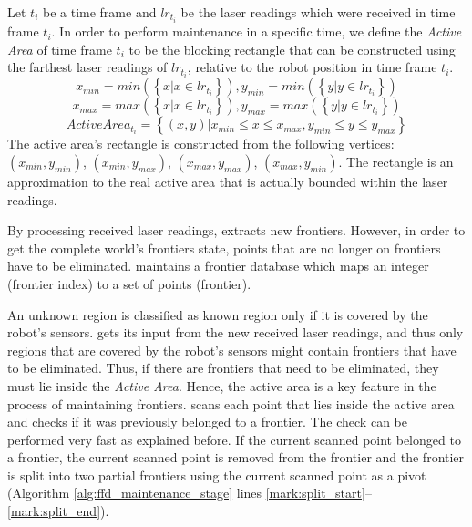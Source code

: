 	Let $t_i$ be a time frame and $lr_{t_i}$ be the laser readings which
	were received in time frame $t_i$. In order to perform maintenance in a specific
	time, we define the \emph{Active Area} of time frame $t_i$ to be the blocking
	rectangle that can be constructed using the farthest laser readings of
	$lr_{t_i}$, relative to the robot position in time frame $t_i$. 
	$$ x_{min} = min(\left\{x | x \in lr_{t_i} \right\}) ,
	 y_{min} = min(\left\{y | y \in lr_{t_i} \right\}) $$ 
	$$ x_{max} = max(\left\{x | x \in lr_{t_i} \right\}) ,
	 y_{max} = max(\left\{y | y \in lr_{t_i} \right\}) $$ 
	$$ActiveArea_{t_i} = \left\{\left(x,y \right) | x_{min}  \leq x \leq x_{max} ,
	y_{min}  \leq y \leq y_{max} \right\}$$ 
	The active area's rectangle is constructed from the following vertices: 
	$\left(x_{min},y_{min} \right)$,
	        $\left(x_{min},y_{max} \right)$,
	        $\left(x_{max},y_{max} \right)$,
	        $\left(x_{max},y_{min} \right)$. 
	The rectangle is an approximation to the real active area that is actually
	bounded within the laser readings. 

	By processing received laser readings, \FFD extracts new frontiers.
	However, in order to get the complete world's frontiers state, points
	that are no longer on frontiers have to be eliminated. \FFD maintains a frontier
	database which maps an integer (frontier index) to a set of points (frontier).
	
	An unknown region is classified as known region only if it is covered by the
	robot's sensors. \FFD gets its input from the new received
	laser readings, and thus only regions that are covered by the
	robot's sensors might contain frontiers that have to be eliminated. Thus, if there are frontiers that need to be eliminated, they must
	lie inside the \emph{Active Area}. Hence, the active area is a key feature
	in the process of maintaining frontiers. \FFD scans each point that lies inside
	the active area and checks if it was previously belonged to a frontier. The
	check can be performed very fast as explained before. If the current scanned
	point belonged to a frontier, the current scanned point is removed from
	the frontier and the frontier is split into two partial frontiers using the
	current scanned point as a pivot (Algorithm \ref{alg:ffd_maintenance_stage} lines
	\ref{mark:split_start}--\ref{mark:split_end}).
 
